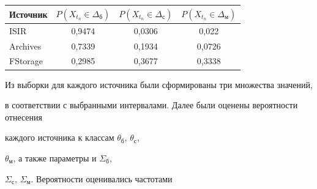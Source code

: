 \begin{table}\small


\begin{center}


\parbox{270pt}{





}


\vspace*{2ex}





\begin{tabular}{|l|c|c|c|}


\hline


\multicolumn{1}{|c|}{Источник}&$P(X_{t_n}\in \Delta_{\mathrm{б}})$&$P(X_{t_n}\in \Delta_{\mathrm{с}})$&$P(X_{t_n}\in 


\Delta_{\mathrm{м}})$\\


\hline


ISIR&0,9474&0,0306&0,022\hphantom{9}\\


Archives&0,7339&0,1934&0,0726\\


FStorage&0,2985&0,3677&0,3338\\


\hline


\end{tabular}


\end{center}


\vspace*{-12pt}


\end{table}





      Из выборки для каждого источника были сформированы три множества значений, 


в соответствии с выбранными интервалами. Далее были оценены вероятности отнесения 


каждого источника к классам $\theta_{\mathrm{б}}$, $\theta_{\mathrm{с}}$, 


$\theta_{\mathrm{м}}$, а также параметры   и $\Sigma_{\mathrm{б}}$, 


$\Sigma_{\mathrm{с}}$, $\Sigma_{\mathrm{м}}$. Вероятности оценивались частотами 



